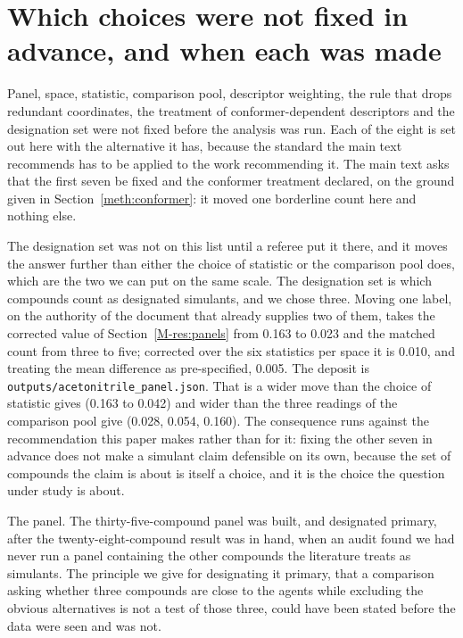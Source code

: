 \documentclass[11pt,a4paper]{article}
\begin{document}
\section{Which choices were not fixed in advance, and when each was made}
\label{meth:prespec}

Panel, space, statistic, comparison pool, descriptor weighting, the rule that
drops redundant coordinates, the treatment of conformer-dependent descriptors
and the designation set were not fixed before the analysis was run. Each of the
eight is set out here with the alternative it has, because the standard the main
text recommends has to be applied to the work recommending it. The main text
asks that the first seven be fixed and the conformer treatment declared, on the
ground given in Section~\ref{meth:conformer}: it moved one borderline count
here and nothing else.

The designation set was not on this list until a referee put it there, and it
moves the answer further than either the choice of statistic or the comparison
pool does, which are the two we can put on the same scale. The designation set is which
compounds count as designated simulants, and we chose three. Moving one label,
on the authority of the document that already supplies two of them, takes the
corrected value of Section~\ref{M-res:panels} from 0.163 to 0.023 and the
matched count from three to five; corrected over the six statistics per space
it is 0.010, and treating the mean difference as pre-specified, 0.005. The
deposit is
\texttt{outputs/acetonitrile\_panel.json}. That is a wider move than the choice of statistic gives
(0.163 to 0.042) and wider than the three readings of the comparison pool give
(0.028, 0.054, 0.160). The consequence runs against the recommendation this
paper makes rather than for it: fixing the other seven in advance does not make
a simulant claim defensible on its own, because the set of compounds the claim
is about is itself a choice, and it is the choice the question under study is
about.

The panel. The thirty-five-compound panel was built, and designated primary,
after the twenty-eight-compound result was in hand, when an audit found we had
never run a panel containing the other compounds the literature treats as
simulants. The principle we give for designating it primary, that a
comparison asking whether three compounds are close to the agents while
excluding the obvious alternatives is not a test of those three, could have
been stated before the data were seen and was not.
\end{document}
